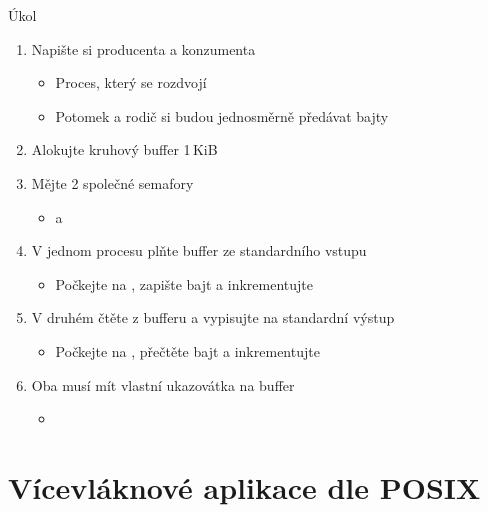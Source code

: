 \begin{frame}{Úkol}

  \begin{enumerate}
    \item Napište si producenta a konzumenta
    \begin{itemize}
      \item Proces, který se rozdvojí
      \item Potomek a rodič si budou jednosměrně předávat bajty
    \end{itemize}

    \item Alokujte kruhový buffer 1\,KiB
    \item Mějte 2 společné semafory
    \begin{itemize}
      \item {} a 
    \end{itemize}

    \item V jednom procesu plňte buffer ze standardního vstupu
    \begin{itemize}
      \item Počkejte na , zapište bajt a inkrementujte 
    \end{itemize}

    \item V druhém čtěte z bufferu a vypisujte na standardní výstup
    \begin{itemize}
      \item Počkejte na , přečtěte bajt a inkrementujte 
    \end{itemize}

    \item Oba musí mít vlastní ukazovátka na buffer
    \begin{itemize}
      \item {} \\
    \end{itemize}
  \end{enumerate}

\end{frame}

\section{Vícevláknové aplikace dle POSIX}
\frame{\sectionpage}

